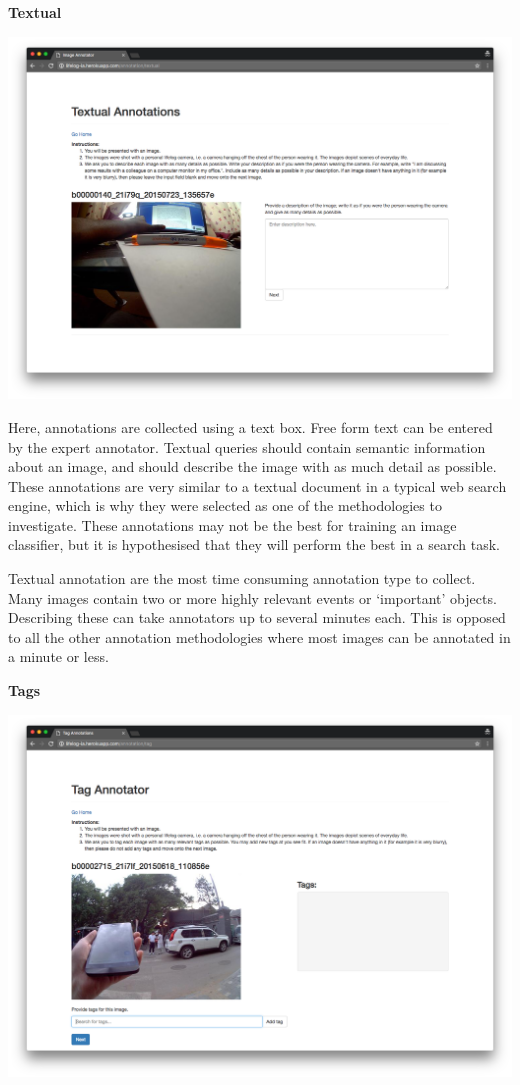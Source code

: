 \newpage
\textbf{Textual}

\includegraphics[width=\textwidth]{images/text-interface}

Here, annotations are collected using a text box. Free form text can be entered by the expert annotator. Textual queries should contain semantic information about an image, and should describe the image with as much detail as possible. These annotations are very similar to a textual document in a typical web search engine, which is why they were selected as one of the methodologies to investigate. These annotations may not be the best for training an image classifier, but it is hypothesised that they will perform the best in a search task.

Textual annotation are the most time consuming annotation type to collect. Many images contain two or more highly relevant events or `important' objects. Describing these can take annotators up to several minutes each. This is opposed to all the other annotation methodologies where most images can be annotated in a minute or less.

\newpage
\textbf{Tags}

\includegraphics[width=\textwidth]{images/tag-interface}

